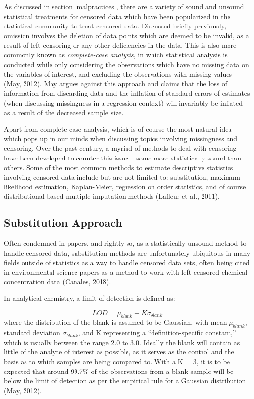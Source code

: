 \documentclass[12pt, twoside]{amherstthesis}
\begin{document}
As discussed in section \ref{malpractices}, there are a variety of sound and unsound statistical treatments for censored data which have been popularized in the statistical community to treat censored data. Discussed briefly previously, omission involves the deletion of data points which are deemed to be invalid, as a result of left-censoring or any other deficiencies in the data. This is also more commonly known as \emph{complete-case analysis}, in which statistical analysis is conducted while only considering the observations which have no missing data on the variables of interest, and excluding the observations with missing values (May, 2012). May argues against this approach and claims that the loss of information from discarding data and the inflation of standard errors of estimates (when discussing missingness in a regression context) will invariably be inflated as a result of the decreased sample size.

Apart from complete-case analysis, which is of course the most natural idea which pops up in our minds when discussing topics involving missingness and censoring. Over the past century, a myriad of methods to deal with censoring have been developed to counter this issue -- some more statistically sound than others. Some of the most common methods to estimate descriptive statistics involving censored data include but are not limited to: substitution, maximum likelihood estimation, Kaplan-Meier, regression on order statistics, and of course distributional based multiple imputation methods (Lafleur et al., 2011).

\hypertarget{Substitution}{%
\subsection{Substitution Approach}\label{Substitution}}

Often condemned in papers, and rightly so, as a statistically unsound method to handle censored data, substitution methods are unfortunately ubiquitous in many fields outside of statistics as a way to handle censored data sets, often being cited in environmental science papers as a method to work with left-censored chemical concentration data (Canales, 2018).

In analytical chemistry, a limit of detection is defined as:

\[LOD = \mu_{blank} + K\sigma_{blank}\]
where the distribution of the blank is assumed to be Gaussian, with mean \(\mu_{blank}\), standard deviation \(\sigma_{blank}\), and K representing a ``definition-specific constant,'' which is usually between the range 2.0 to 3.0. Ideally the blank will contain as little of the analyte of interest as possible, as it serves as the control and the basis as to which samples are being compared to. With a K = 3, it is to be expected that around 99.7\% of the observations from a blank sample will be below the limit of detection as per the empirical rule for a Gaussian distribution (May, 2012).
\end{document}
